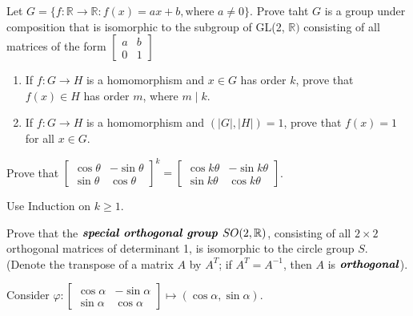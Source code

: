 \documentclass[15pt]{article}
\newenvironment{exercise}[2][Exercise]{\begin{trivlist}
\item[\hskip \labelsep {\bfseries #1}\hskip \labelsep {\bfseries #2.}]}
{\end{trivlist}}
\newenvironment{hint}[2][Hint]{\begin{trivlist}
    \item[\hskip \labelsep {\bfseries #1}\hskip \labelsep {\bfseries #2.}]}
    {\end{trivlist}}
\begin{document}
\begin{exercise}{1.53}
    Let $G=\{ f:\mathbb R \rightarrow \mathbb R: f(x) = ax+b, \text{where } a\neq 0\}$. Prove taht $G$ is a group under composition that 
    is isomorphic to the subgroup of GL(2, $\mathbb{R})$ consisting of all matrices of the form 
    $\begin{bmatrix}
        a & b \\ 0 & 1
    \end{bmatrix}$
\end{exercise}


\begin{exercise}{1.54}
    \begin{enumerate}
        \item[(i)] If $f: G\rightarrow H$ is a homomorphism and $x\in G$ has order $k$, prove that $f(x)\in H$ has order $m$, 
        where $m\mid k$.
        \item[(ii)] If $f: G\rightarrow H$ is a homomorphism and $(|G|, |H|) = 1$, prove that $f(x)=1$ for all $x\in G$.
    \end{enumerate}
\end{exercise}


\begin{exercise}{1.55}
    \begin{enumerate}
        \item[(i)] Prove that $\begin{bmatrix}\cos\theta & -\sin\theta \\ \sin\theta & \cos\theta\end{bmatrix}^k = 
        \begin{bmatrix}\cos k\theta & -\sin k\theta \\ \sin k\theta & \cos k\theta\end{bmatrix}$.
        \begin{hint}{}
            Use Induction on $k \geq 1$.
        \end{hint}
        \item[(ii)] Prove that the $\textbf{\textit{special orthogonal group }} SO(2, \mathbb{R})$, consisting of all $2\times 2$
        orthogonal matrices of determinant 1, is isomorphic to the circle group $S$. (Denote the transpose of a matrix $A$ by $A^T$;
        if $A^T=A^{-1}$, then $A$ is $\textbf{\textit{orthogonal}}$).
        \begin{hint}{}
            Consider $\varphi: \begin{bmatrix}\cos\alpha & -\sin\alpha \\ \sin\alpha & \cos\alpha\end{bmatrix} \mapsto (\cos\alpha, \sin\alpha)$.
        \end{hint}
    \end{enumerate}
\end{exercise}
\end{document}
